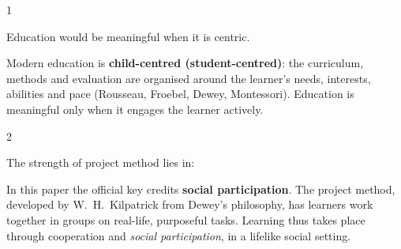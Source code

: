 \begin{question}{1}
{Education would be meaningful when it is \blank{} centric.\par}
\begin{explain}
Modern education is \textbf{child-centred (student-centred)}: the curriculum, methods and evaluation are organised around the learner's needs, interests, abilities and pace (Rousseau, Froebel, Dewey, Montessori). Education is meaningful only when it engages the learner actively.
\end{explain}
\end{question}

\begin{question}{2}
{The strength of project method lies in:\par}
\begin{explain}
In this paper the official key credits \textbf{social participation}. The project method, developed by W.~H.~Kilpatrick from Dewey's philosophy, has learners work together in groups on real-life, purposeful tasks. Learning thus takes place through cooperation and \emph{social participation}, in a lifelike social setting.
\end{explain}
\end{question}

